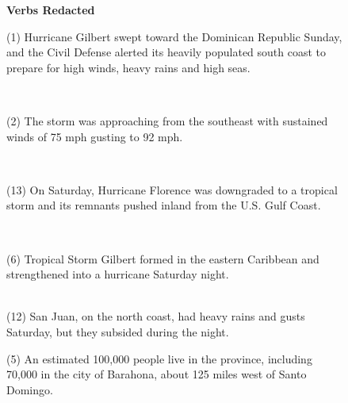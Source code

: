 \begin{figure}[p]
{\begin{minipage}{\textwidth}
\textbf{Verbs Redacted}\\
\colorbox{Orchid!25!}{\begin{minipage}{\textwidth}(1) Hurricane Gilbert swept toward the Dominican Republic Sunday, and the Civil Defense alerted its heavily populated south coast to prepare for high winds, heavy rains and high seas.\end{minipage}}\\
\colorbox{Dandelion!25!}{\begin{minipage}{\textwidth}(2) The storm was approaching from the southeast with sustained winds of 75 mph gusting to 92 mph.\end{minipage}}\\
\colorbox{green!25!}{\begin{minipage}{\textwidth}(13) On Saturday, Hurricane Florence was downgraded to a tropical storm and its remnants pushed inland from the U.S. Gulf Coast.\end{minipage}}\\
\colorbox{ProcessBlue!15!}{\begin{minipage}{\textwidth}(6) Tropical Storm Gilbert formed in the eastern Caribbean and strengthened into a hurricane Saturday night.\end{minipage}}\\
(12) San Juan, on the north coast, had heavy rains and gusts Saturday, but they subsided during the night.\\
\colorbox{GreenYellow!35!}{\begin{minipage}{\textwidth}(5) An estimated 100,000 people live in the province, including 70,000 in the city of Barahona, about 125 miles west of Santo Domingo.\end{minipage}}\\


\end{minipage}}
\end{figure}
